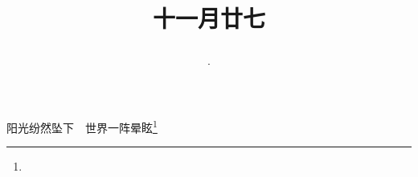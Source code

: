 \title{\date[d=27,m=12,y=2024][year:cn-y,年,month:cn,day:cn,日,·,weekday]·十一月廿七 }
阳光纷然坠下　世界一阵晕眩\footnote{ }

